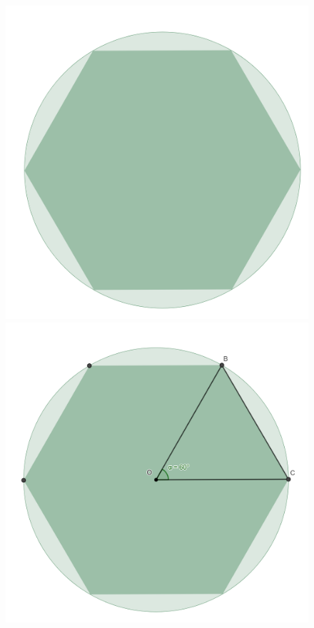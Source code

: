 \documentclass{article}
\begin{document}
\begin{figure}[h!]
	\centering
	\includegraphics[scale=0.5]{img/fig1.png}
	\includegraphics[scale=0.5]{img/fig2.png}
	\label{fig:1}
\end{figure}
\end{document}
